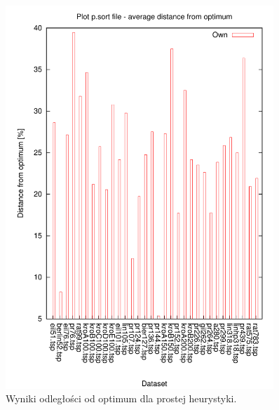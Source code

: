 \begin{figure}
\begin{center}
\includegraphics[width=0.9\textwidth]{wykresy/own_results}
\end{center}
\caption{Wyniki odległości od optimum dla prostej heurystyki.}
\label{own_results}
\end{figure}


